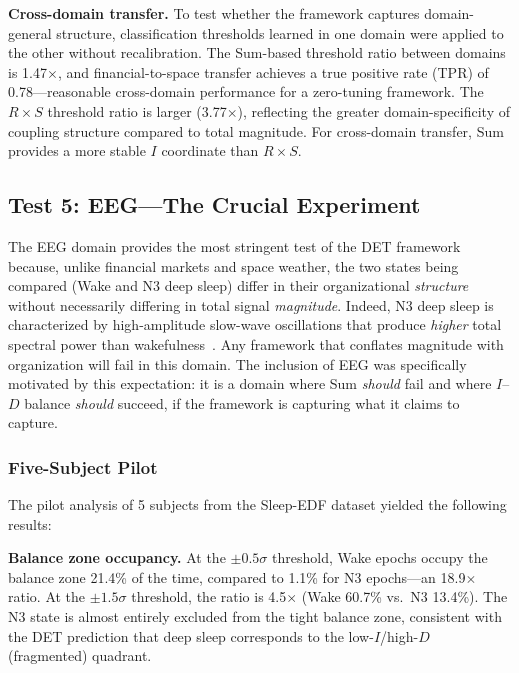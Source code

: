 \documentclass[aip,cha,reprint,amsmath,amssymb,final,floatfix]{revtex4-2}
\begin{document}
\textbf{Cross-domain transfer.} To test whether the framework captures domain-general structure, classification thresholds learned in one domain were applied to the other without recalibration. The Sum-based threshold ratio between domains is 1.47$\times$, and financial-to-space transfer achieves a true positive rate (TPR) of 0.78---reasonable cross-domain performance for a zero-tuning framework. The $R \times S$ threshold ratio is larger (3.77$\times$), reflecting the greater domain-specificity of coupling structure compared to total magnitude. For cross-domain transfer, Sum provides a more stable $I$ coordinate than $R \times S$.

\subsection{\label{sec:eeg}Test 5: EEG---The Crucial Experiment}

The EEG domain provides the most stringent test of the DET framework because, unlike financial markets and space weather, the two states being compared (Wake and N3 deep sleep) differ in their organizational \emph{structure} without necessarily differing in total signal \emph{magnitude}. Indeed, N3 deep sleep is characterized by high-amplitude slow-wave oscillations that produce \emph{higher} total spectral power than wakefulness~\cite{massimini2005}. Any framework that conflates magnitude with organization will fail in this domain. The inclusion of EEG was specifically motivated by this expectation: it is a domain where Sum \emph{should} fail and where $I$--$D$ balance \emph{should} succeed, if the framework is capturing what it claims to capture.

\subsubsection{Five-Subject Pilot}

The pilot analysis of 5 subjects from the Sleep-EDF dataset yielded the following results:

\textbf{Balance zone occupancy.} At the $\pm 0.5\sigma$ threshold, Wake epochs occupy the balance zone 21.4\% of the time, compared to 1.1\% for N3 epochs---an 18.9$\times$ ratio. At the $\pm 1.5\sigma$ threshold, the ratio is 4.5$\times$ (Wake 60.7\% vs.\ N3 13.4\%). The N3 state is almost entirely excluded from the tight balance zone, consistent with the DET prediction that deep sleep corresponds to the low-$I$/high-$D$ (fragmented) quadrant.
\end{document}
